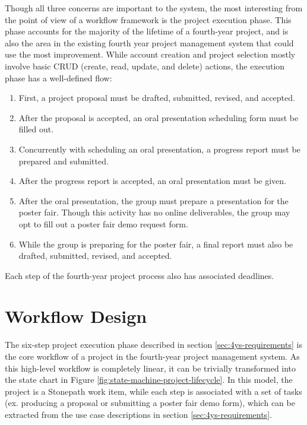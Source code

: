 \documentclass[document.tex]{subfiles}
\begin{document}
Though all three concerns are important to the system, the most interesting from the point of view of a workflow framework is the project execution phase. This phase accounts for the majority of the lifetime of a fourth-year project, and is also the area in the existing fourth year project management system that could use the most improvement. While account creation and project selection mostly involve basic CRUD (create, read, update, and delete) actions, the execution phase has a well-defined flow:
\begin{enumerate}
\item First, a project proposal must be drafted, submitted, revised, and accepted.
\item After the proposal is accepted, an oral presentation scheduling form must be filled out.
\item Concurrently with scheduling an oral presentation, a progress report must be prepared and submitted.
\item After the progress report is accepted, an oral presentation must be given.
\item After the oral presentation, the group must prepare a presentation for the poster fair. Though this activity has no online deliverables, the group may opt to fill out a poster fair demo request form.
\item While the group is preparing for the poster fair, a final report must also be drafted, submitted, revised, and accepted.
\end{enumerate}
Each step of the fourth-year project process also has associated deadlines.

\FloatBarrier


\section{Workflow Design}
\label{sec:4ys-workflow-design}

The six-step project execution phase described in section \ref{sec:4ys-requirements} is the core workflow of a project in the fourth-year project management system. As this high-level workflow is completely linear, it can be trivially transformed into the state chart in Figure \ref{fig:state-machine-project-lifecycle}. In this model, the project is a Stonepath work item, while each step is associated with a set of tasks (ex. producing a proposal or submitting a poster fair demo form), which can be extracted from the use case descriptions in section \ref{sec:4ys-requirements}.
\end{document}
